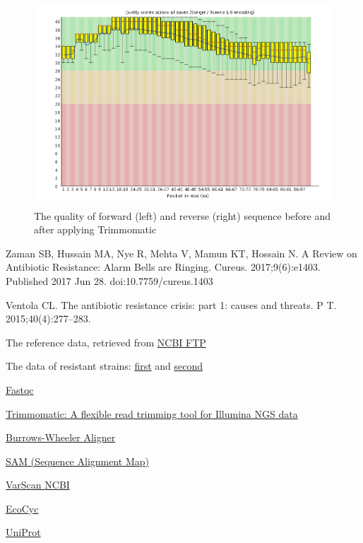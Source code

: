 \documentclass{article}
\begin{document}
\begin{figure}[h]
\includegraphics[scale=0.35]{rev_aft_trim.png}
\caption{ The quality of forward (left) and reverse (right) sequence before and after applying Trimmomatic  }
\label{saw}
\end{figure}


\newpage
\begin{thebibliography}{9}

Zaman SB, Hussain MA, Nye R, Mehta V, Mamun KT, Hossain N. A Review on Antibiotic Resistance: Alarm Bells are Ringing. Cureus. 2017;9(6):e1403. Published 2017 Jun 28. doi:10.7759/cureus.1403 

Ventola CL. The antibiotic resistance crisis: part 1: causes and threats. P T. 2015;40(4):277–283. 

The reference data, retrieved  from \href{ftp://ftp.ncbi.nlm.nih.gov/genomes/all/GCA/000/005/845/GCA_000005845.2_ASM584v2}{NCBI FTP}
 
The data of resistant strains:  \href{http://public.dobzhanskycenter.ru/mrayko/amp_res_1.fastq.zip}{first} and 
\href{http://public.dobzhanskycenter.ru/mrayko/amp_res_2.fastq.zip}{second} 

\href{https://www.bioinformatics.babraham.ac.uk/projects/fastqc/}{Fastqc}

\href{http://www.usadellab.org/cms/?page=trimmomatic}{Trimmomatic: A flexible read trimming tool for Illumina NGS data}

\href{http://bio-bwa.sourceforge.net/}{Burrows-Wheeler Aligner}

\href{http://samtools.sourceforge.net/}{SAM (Sequence Alignment Map) }

\href{http://dkoboldt.github.io/varscan/}{VarScan }
\href{ https://www.ncbi.nlm.nih.gov/nuccore/NC_000913.3?report=graph}{NCBI }
 
\href{https://biocyc.org/gene?orgid=ECOLI&id=EG10341}{EcoCyc }

\href{https://www.uniprot.org/uniprot/P0AD68}{UniProt}


\end{thebibliography}
\end{document}
